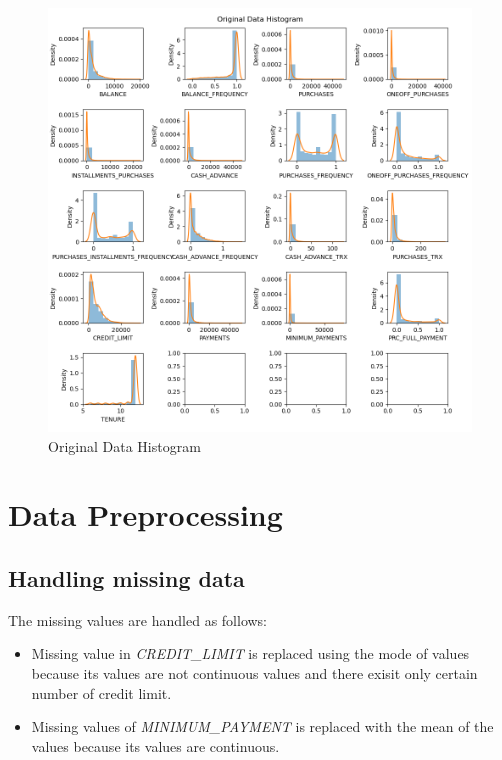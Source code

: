 \documentclass{article}
\begin{document}
        \begin{figure}[h]
            \includegraphics[scale=0.475]{original_data_histogram.png}
            \caption{Original Data Histogram}
            \label{fig:original_data_histogram}
        \end{figure}
    \endgroup

    \endgroup

    \hfill
    
    \begingroup
        \section {Data Preprocessing}
        
        \begingroup
            \subsection {Handling missing data}
            
            The missing values are handled as follows:
            \begin{itemize}
                \item Missing value in \textit{CREDIT\_LIMIT} is replaced using the mode of values because its values are not continuous values and there exisit only certain number of credit limit.
                \item Missing values of \textit{MINIMUM\_PAYMENT} is replaced with the mean of the values because its values are continuous.
            \end{itemize}
        \endgroup
\end{document}
